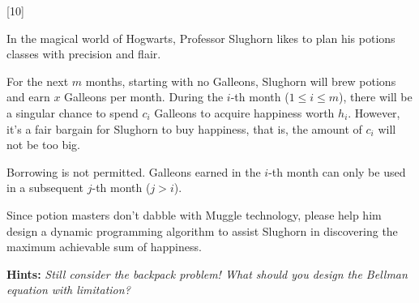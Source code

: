[10]

In the magical world of Hogwarts, Professor Slughorn likes to plan his potions classes with precision and flair.

For the next \( m \) months, starting with no Galleons, Slughorn will brew potions and earn \( x \) Galleons per month. During the \( i \)-th month (\( 1 \leq i \leq m \)), there will be a singular chance to spend \( c_i \) Galleons to acquire happiness worth \( h_i \). However, it's a fair bargain for Slughorn to buy happiness, that is, the amount of $c_i$ will not be too big.

Borrowing is not permitted. Galleons earned in the \( i \)-th month can only be used in a subsequent \( j \)-th month (\( j > i \)).

Since potion masters don't dabble with Muggle technology, please help him design a dynamic programming algorithm to assist Slughorn in discovering the maximum achievable sum of happiness.

\textbf{Hints: } \textit{Still consider the backpack problem! What should you design the Bellman equation with limitation?}

\begin{solution}
    \vspace{5in}
    
\end{solution}